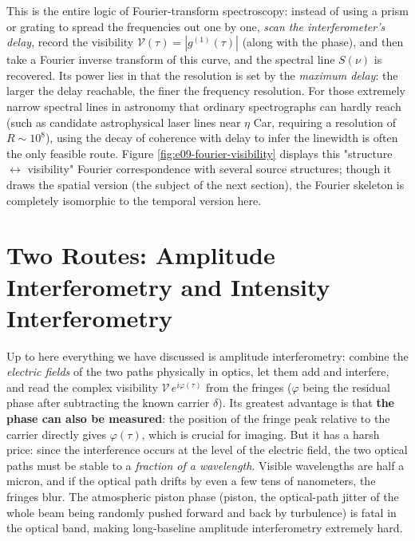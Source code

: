 This is the entire logic of Fourier-transform spectroscopy: instead of using a prism or grating to spread the frequencies out one by one, \emph{scan the interferometer's delay}, record the visibility \(\mathcal V(\tau)=|g^{(1)}(\tau)|\) (along with the phase), and then take a Fourier inverse transform of this curve, and the spectral line \(S(\nu)\) is recovered. Its power lies in that the resolution is set by the \emph{maximum delay}: the larger the delay reachable, the finer the frequency resolution. For those extremely narrow spectral lines in astronomy that ordinary spectrographs can hardly reach (such as candidate astrophysical laser lines near \(\eta\) Car, requiring a resolution of \(R\sim10^8\)), using the decay of coherence with delay to infer the linewidth is often the only feasible route. Figure \ref{fig:e09-fourier-visibility} displays this "structure \(\leftrightarrow\) visibility" Fourier correspondence with several source structures; though it draws the spatial version (the subject of the next section), the Fourier skeleton is completely isomorphic to the temporal version here.

\section{Two Routes: Amplitude Interferometry and Intensity Interferometry}
\label{sec:e09-two-routes}

Up to here everything we have discussed is amplitude interferometry: combine the \emph{electric fields} of the two paths physically in optics, let them add and interfere, and read the complex visibility \(\mathcal V\,e^{i\varphi(\tau)}\) from the fringes (\(\varphi\) being the residual phase after subtracting the known carrier \(\delta\)). Its greatest advantage is that \textbf{the phase can also be measured}: the position of the fringe peak relative to the carrier directly gives \(\varphi(\tau)\), which is crucial for imaging. But it has a harsh price: since the interference occurs at the level of the electric field, the two optical paths must be stable to a \emph{fraction of a wavelength}. Visible wavelengths are half a micron, and if the optical path drifts by even a few tens of nanometers, the fringes blur. The atmospheric piston phase (piston, the optical-path jitter of the whole beam being randomly pushed forward and back by turbulence) is fatal in the optical band, making long-baseline amplitude interferometry extremely hard.

